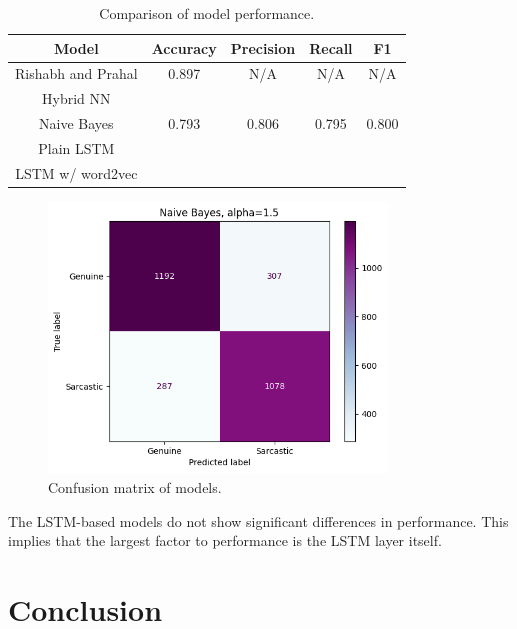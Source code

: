 \documentclass[11pt]{article}
\begin{document}
\begin{table}[tbh]
    \centering
    \begin{tabular}{|c|c|c|c|c|}
        \hline
        Model              & Accuracy & Precision & Recall & F1    \\
        \hline
        Rishabh and Prahal & 0.897    & N/A       & N/A    & N/A   \\
        Hybrid NN          &          &           &        &       \\
        \hline
        Naive Bayes        & 0.793    & 0.806     & 0.795  & 0.800 \\
        \hline
        Plain LSTM         &          &           &        &       \\
        \hline
        LSTM w/ word2vec   &          &           &        &       \\
        \hline
    \end{tabular}
    \caption{Comparison of model performance.}
    \label{tab:perf}
\end{table}

\begin{figure}[tbh]
    \centering
    \includegraphics[width=9cm]{nb-cm.png}
    \caption{Confusion matrix of models.}
    \label{fig:cm}
\end{figure}




The LSTM-based models do not show significant differences in performance.
This implies that the largest factor to performance is the LSTM layer itself.

\section{Conclusion}
\end{document}
